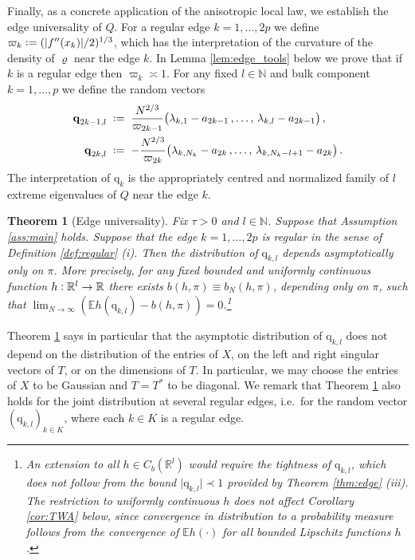\documentclass[11pt]{article} %
\numberwithin{equation}{section}
\numberwithin{figure}{section}
\theoremstyle{plain} %
\newtheorem{theorem}{Theorem}[section]
\theoremstyle{definition} %
\newcommand{\f}[1]{\boldsymbol{\mathrm{#1}}} %
\newcommand{\E}{\mathbb{E}}
\newcommand{\R}{\mathbb{R}}
\newcommand{\N}{\mathbb{N}}
\newcommand{\col}{\mathrel{\vcenter{\baselineskip0.75ex \lineskiplimit0pt \hbox{.}\hbox{.}}}}
\newcommand*{\deq}{\mathrel{\vcenter{\baselineskip0.65ex \lineskiplimit0pt \hbox{.}\hbox{.}}}=}
\newcommand{\pb}[1]{\bigl({#1}\bigr)}
\newcommand{\abs}[1]{\lvert #1 \rvert}
\begin{document}
Finally, as a concrete application of the anisotropic local law, we establish the edge universality of $Q$. For a regular edge $k = 1, \dots, 2p$ we define $\varpi_k \deq (\abs{f''(x_k)}/2)^{1/3}$, which has the interpretation of the curvature of the density of $\varrho$ near the edge $k$. In Lemma \ref{lem:edge_tools} below we prove that if $k$ is a regular edge then $\varpi_k \asymp 1$. For any fixed $l \in \N$ and bulk component $k = 1, \dots, p$ we define the random vectors
\begin{align*}
\f q_{2k - 1,l} &\;\deq\; \frac{N^{2/3}}{\varpi_{2k - 1}} \pb{\lambda_{k,1} - a_{2k - 1}\,,\dots, \,\lambda_{k,l} - a_{2k - 1}}\,,
\\
\f q_{2k,l} &\;\deq\; -\frac{N^{2/3}}{\varpi_{2k}} \pb{\lambda_{k,N_k} - a_{2k}\,, \dots,\, \lambda_{k,N_k - l+1} - a_{2k}}\,.
\end{align*}
The interpretation of $\f q_k$ is the appropriately centred and normalized family of $l$ extreme eigenvalues of $Q$ near the edge $k$.

\begin{theorem}[Edge universality] \label{thm:edge_univ}
Fix $\tau > 0$ and $l \in \N$. Suppose that Assumption \ref{ass:main} holds. Suppose that the edge $k = 1, \dots, 2p$ is regular in the sense of Definition \ref{def:regular} (i). Then the distribution of $\f q_{k,l}$ depends asymptotically only on $\pi$. More precisely, for any fixed bounded and uniformly continuous function $h \col \R^l \to \R$ there exists $b(h,\pi) \equiv b_N(h,\pi)$, depending only on $\pi$, such that $\lim_{N \to \infty} (\E h(\f q_{k,l}) - b(h,\pi)) = 0$.\footnote{An extension to all $h \in C_b(\R^l)$ would require the tightness of $\f q_{k,l}$, which does not follow from the bound $\abs{\f q_{k,l}} \prec 1$ provided by Theorem \ref{thm:edge} (iii). The restriction to uniformly continuous $h$ does not affect Corollary \ref{cor:TWA} below, since convergence in distribution to a probability measure follows from the convergence of $\E h(\cdot)$ for all bounded Lipschitz functions $h$.}
\end{theorem}

Theorem \ref{thm:edge_univ} says in particular that the asymptotic distribution of $\f q_{k,l}$ does not depend on the distribution of the entries of $X$, on the left and right singular vectors of $T$, or on the dimensions of $T$. In particular, we may choose the entries of $X$ to be Gaussian and $T = T^*$ to be diagonal. We remark that Theorem \ref{thm:edge_univ} also holds for the joint distribution at several regular edges, i.e.\ for the random vector $(\f q_{k,l})_{k \in K}$, where each $k \in K$ is a regular edge.
\end{document}
